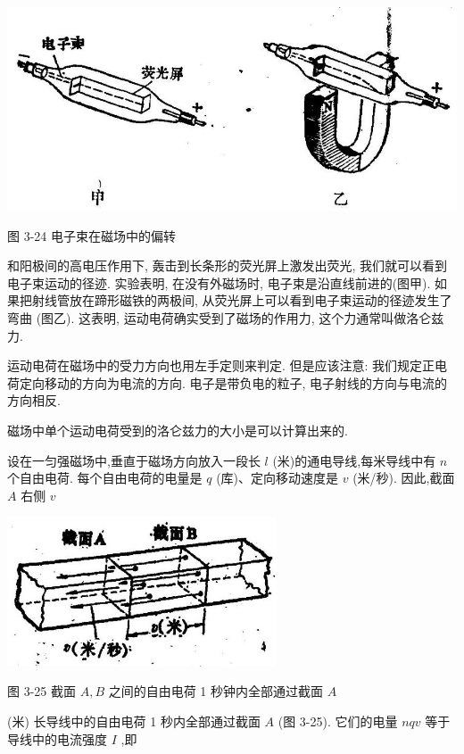 \documentclass[10pt]{article}
\begin{document}
\begin{center}
\includegraphics[max width=1.0\textwidth]{images/01913056-1f15-74d8-9184-9aab52c9d66b_118_969968.jpg}
\end{center}

图 3-24 电子束在磁场中的偏转

和阳极间的高电压作用下, 轰击到长条形的荧光屏上激发出荧光, 我们就可以看到电子束运动的径迹. 实验表明, 在没有外磁场时, 电子束是沿直线前进的(图甲). 如果把射线管放在蹄形磁铁的两极间, 从荧光屏上可以看到电子束运动的径迹发生了弯曲 (图乙). 这表明, 运动电荷确实受到了磁场的作用力, 这个力通常叫做洛仑兹力.

运动电荷在磁场中的受力方向也用左手定则来判定. 但是应该注意: 我们规定正电荷定向移动的方向为电流的方向. 电子是带负电的粒子, 电子射线的方向与电流的方向相反.

磁场中单个运动电荷受到的洛仑兹力的大小是可以计算出来的.

设在一匀强磁场中,垂直于磁场方向放入一段长 \(l\) (米)的通电导线,每米导线中有 \(n\) 个自由电荷. 每个自由电荷的电量是 \(q\) (库)、定向移动速度是 \(v\) (米/秒). 因此,截面 \(A\) 右侧 \(v\)

\begin{center}
\includegraphics[max width=0.6\textwidth]{images/01913056-1f15-74d8-9184-9aab52c9d66b_119_929509.jpg}
\end{center}

图 3-25 截面 \(A,B\) 之间的自由电荷 1 秒钟内全部通过截面 \(A\)

(米) 长导线中的自由电荷 1 秒内全部通过截面 \(A\) (图 3-25). 它们的电量 \({nqv}\) 等于导线中的电流强度 \(I\) ,即
\end{document}

